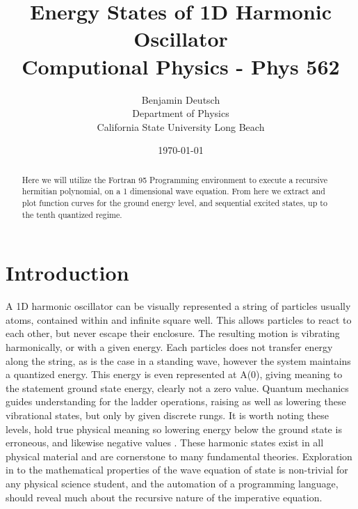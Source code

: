 \documentclass[12pt,letterpaper,notitlepage]{article}
\begin{document}




\title{%
	Energy States of 1D Harmonic Oscillator \\
\large Computional Physics - Phys 562}
\author{Benjamin Deutsch  \\
Department of Physics\\
California State University Long Beach}
\date{\today }

  
\maketitle



\begin{abstract}
Here we will utilize the Fortran 95 Programming environment to execute a recursive hermitian polynomial, on a 1 dimensional wave equation. From here we extract and plot function curves for the ground energy level, and sequential excited states, up to the tenth quantized regime.        
\end{abstract}

\section{Introduction}

A 1D harmonic oscillator can be visually represented a string of particles usually atoms, contained within and infinite square well. This allows particles to react to each other, but never escape their enclosure. The resulting motion is vibrating harmonically, or with a given energy. Each particles does not transfer energy along the string, as is the case in a standing wave, however the system maintains a quantized energy. This energy is even represented at A(0), giving meaning to the statement ground state energy, clearly not a zero value. Quantum mechanics guides understanding for the ladder operations, raising as well as lowering these vibrational states, but only by given discrete rungs. It is worth noting these levels, hold true physical meaning so lowering energy below the ground state is erroneous, and likewise negative values . These harmonic states exist in all physical material and are cornerstone to many fundamental theories. Exploration in to the mathematical properties of the wave equation of state is non-trivial for any physical science student, and the automation of a programming language, should reveal much about the recursive nature of the imperative equation. 
\end{document}
